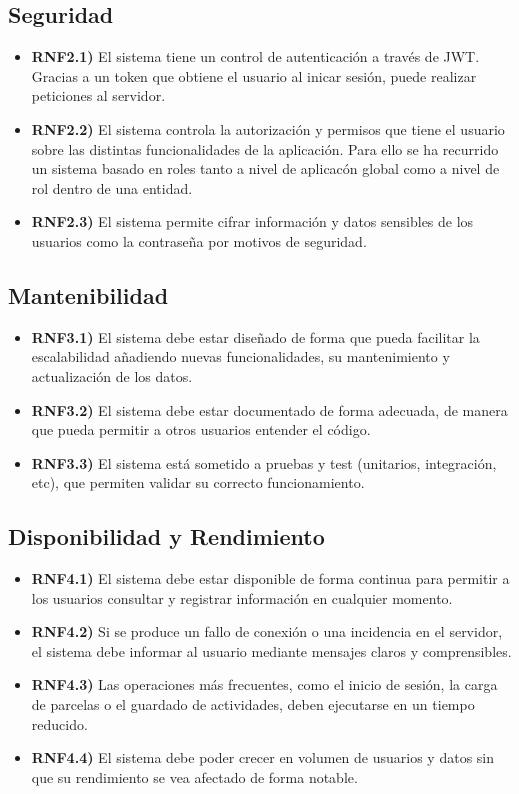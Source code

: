 \subsection{Seguridad}

\begin{itemize}
    \item \textbf{RNF2.1)} El sistema tiene un control de autenticación a través de JWT. Gracias a un token que obtiene el 
    usuario al inicar sesión, puede realizar peticiones al servidor.
    \item \textbf{RNF2.2)} El sistema controla la autorización y permisos que tiene el usuario sobre las distintas 
    funcionalidades de la aplicación. Para ello se ha recurrido un sistema basado en roles tanto a nivel de aplicacón global
    como a nivel de rol dentro de una entidad.
    \item \textbf{RNF2.3)} El sistema permite cifrar información y datos sensibles de los usuarios como la contraseña por 
    motivos de seguridad. 
\end{itemize}

\subsection{Mantenibilidad}

\begin{itemize}
    \item \textbf{RNF3.1)} El sistema debe estar diseñado de forma que pueda facilitar la escalabilidad añadiendo nuevas
    funcionalidades, su mantenimiento y actualización de los datos.
    \item \textbf{RNF3.2)} El sistema debe estar documentado de forma adecuada, de manera que pueda permitir
    a otros usuarios entender el código.
    \item \textbf{RNF3.3)} El sistema está sometido a pruebas y test (unitarios, integración, etc), que permiten validar
    su correcto funcionamiento.
\end{itemize}

\subsection{Disponibilidad y Rendimiento}

\begin{itemize}
    \item \textbf{RNF4.1)} El sistema debe estar disponible de forma continua para permitir a los usuarios consultar y registrar información en cualquier momento.
    \item \textbf{RNF4.2)} Si se produce un fallo de conexión o una incidencia en el servidor, el sistema debe informar al usuario mediante mensajes claros y comprensibles.
    \item \textbf{RNF4.3)} Las operaciones más frecuentes, como el inicio de sesión, la carga de parcelas o el guardado de actividades, deben ejecutarse en un tiempo reducido.
    \item \textbf{RNF4.4)} El sistema debe poder crecer en volumen de usuarios y datos sin que su rendimiento se vea afectado de forma notable.
\end{itemize}

